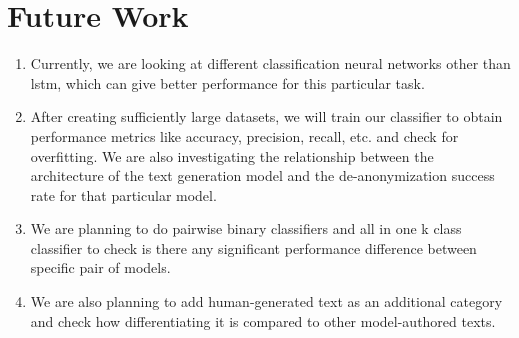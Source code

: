 \documentclass[11pt,letterpaper]{article}
\begin{document}
\section{Future Work}
        \begin{enumerate}
                \item Currently, we are looking at different classification neural networks other than lstm, which can give better performance for this particular task.
                \item After creating sufficiently large datasets, we will train our classifier to obtain performance metrics like accuracy, precision, recall, etc. and check for overfitting. We are also investigating the relationship between the architecture of the text generation model and the de-anonymization success rate for that particular model.
                \item We are planning to do pairwise binary classifiers and all in one k class classifier to check is there any significant performance difference between specific pair of models.
                \item We are also planning to add human-generated text as an additional category and check how differentiating it is compared to other model-authored texts. 
        \end{enumerate}



\end{document}

